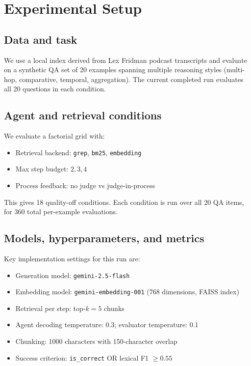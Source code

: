 \documentclass[11pt]{article}
\begin{document}
\section{Experimental Setup}
\subsection{Data and task}
We use a local index derived from Lex Fridman podcast transcripts and evaluate on a synthetic QA set of 20 examples spanning multiple reasoning styles (multi-hop, comparative, temporal, aggregation). The current completed run evaluates all 20 questions in each condition.

\subsection{Agent and retrieval conditions}
We evaluate a factorial grid with:
\begin{itemize}[leftmargin=*, topsep=2pt, itemsep=1pt]
    \item Retrieval backend: \texttt{grep}, \texttt{bm25}, \texttt{embedding}
    \item Max step budget: $2, 3, 4$
    \item Process feedback: no judge vs judge-in-process
\end{itemize}

This gives 18 quality-off conditions. Each condition is run over all 20 QA items, for 360 total per-example evaluations.

\subsection{Models, hyperparameters, and metrics}
Key implementation settings for this run are:
\begin{itemize}[leftmargin=*, topsep=2pt, itemsep=1pt]
    \item Generation model: \texttt{gemini-2.5-flash}
    \item Embedding model: \texttt{gemini-embedding-001} (768 dimensions, FAISS index)
    \item Retrieval per step: top-$k=5$ chunks
    \item Agent decoding temperature: 0.3; evaluator temperature: 0.1
    \item Chunking: 1000 characters with 150-character overlap
    \item Success criterion: \texttt{is\_correct} OR lexical F1 $\ge 0.55$
\end{itemize}
\end{document}
